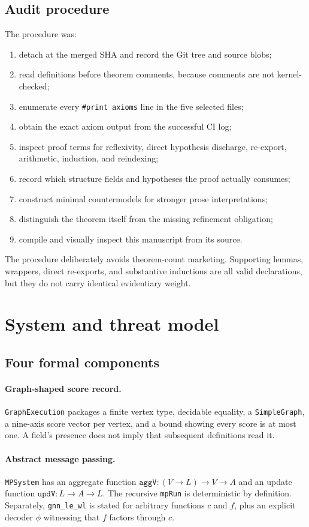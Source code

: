 \documentclass[10pt,letterpaper]{article}
\theoremstyle{definition}
\begin{document}
\subsection{Audit procedure}
The procedure was:
\begin{enumerate}
\item detach at the merged SHA and record the Git tree and source blobs;
\item read definitions before theorem comments, because comments are not
  kernel-checked;
\item enumerate every \texttt{\#print axioms} line in the five selected files;
\item obtain the exact axiom output from the successful CI log;
\item inspect proof terms for reflexivity, direct hypothesis discharge,
  re-export, arithmetic, induction, and reindexing;
\item record which structure fields and hypotheses the proof actually consumes;
\item construct minimal countermodels for stronger prose interpretations;
\item distinguish the theorem itself from the missing refinement obligation;
\item compile and visually inspect this manuscript from its source.
\end{enumerate}
The procedure deliberately avoids theorem-count marketing. Supporting lemmas,
wrappers, direct re-exports, and substantive inductions are all valid
declarations, but they do not carry identical evidentiary weight.

\section{System and threat model}\label{sec:system}
\subsection{Four formal components}
\paragraph{Graph-shaped score record.}
\texttt{GraphExecution} packages a finite vertex type, decidable equality, a
\texttt{SimpleGraph}, a nine-axis score vector per vertex, and a bound showing
every score is at most one. A field's presence does not imply that subsequent
definitions read it.

\paragraph{Abstract message passing.}
\texttt{MPSystem} has an aggregate function
\(\texttt{aggV}:(V\to L)\to V\to A\) and an update function
\(\texttt{updV}:L\to A\to L\). The recursive \texttt{mpRun} is deterministic
by definition. Separately, \texttt{gnn\_le\_wl} is stated for arbitrary
functions \(c\) and \(f\), plus an explicit decoder \(\phi\) witnessing that
\(f\) factors through \(c\).
\end{document}
